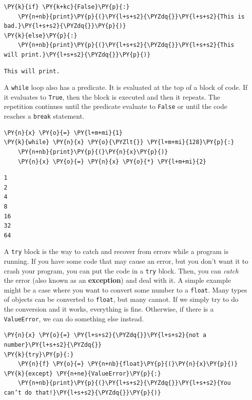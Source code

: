 \begin{Verbatim}[commandchars=\\\{\}]
\PY{k}{if} \PY{k+kc}{False}\PY{p}{:}
    \PY{n+nb}{print}\PY{p}{(}\PY{l+s+s2}{\PYZdq{}}\PY{l+s+s2}{This is bad.}\PY{l+s+s2}{\PYZdq{}}\PY{p}{)}
\PY{k}{else}\PY{p}{:}
    \PY{n+nb}{print}\PY{p}{(}\PY{l+s+s2}{\PYZdq{}}\PY{l+s+s2}{This will print.}\PY{l+s+s2}{\PYZdq{}}\PY{p}{)}
\end{Verbatim}

\begin{Verbatim}
This will print.

\end{Verbatim}


A \texttt{while} loop also has a predicate.  It is evaluated at the top of a block of code.  If it evaluates to \texttt{True}, then the block is executed and then it repeats.  The repetition continues until the predicate evaluate to \texttt{False} or until the code reaches a \texttt{break} statement.


\begin{Verbatim}[commandchars=\\\{\}]
\PY{n}{x} \PY{o}{=} \PY{l+m+mi}{1}
\PY{k}{while} \PY{n}{x} \PY{o}{\PYZlt{}} \PY{l+m+mi}{128}\PY{p}{:}
    \PY{n+nb}{print}\PY{p}{(}\PY{n}{x}\PY{p}{)}
    \PY{n}{x} \PY{o}{=} \PY{n}{x} \PY{o}{*} \PY{l+m+mi}{2}
\end{Verbatim}

\begin{Verbatim}
1
2
4
8
16
32
64

\end{Verbatim}


A \texttt{try} block is the way to catch and recover from errors while a program is running.  If you have some code that may cause an error, but you don’t want it to crash your program, you can put the code in a \texttt{try} block.  Then, you can \emph{catch} the error (also known as an \textbf{exception}) and deal with it.  A simple example might be a case where you want to convert some number to a \texttt{float}.  Many types of objects can be converted to \texttt{float}, but many cannot.  If we simply try to do the conversion and it works, everything is fine.  Otherwise, if there is a \texttt{ValueError}, we can do something else instead.  


\begin{Verbatim}[commandchars=\\\{\}]
\PY{n}{x} \PY{o}{=} \PY{l+s+s2}{\PYZdq{}}\PY{l+s+s2}{not a number}\PY{l+s+s2}{\PYZdq{}}
\PY{k}{try}\PY{p}{:}
    \PY{n}{f} \PY{o}{=} \PY{n+nb}{float}\PY{p}{(}\PY{n}{x}\PY{p}{)}
\PY{k}{except} \PY{n+ne}{ValueError}\PY{p}{:}
    \PY{n+nb}{print}\PY{p}{(}\PY{l+s+s2}{\PYZdq{}}\PY{l+s+s2}{You can’t do that!}\PY{l+s+s2}{\PYZdq{}}\PY{p}{)}
\end{Verbatim}

